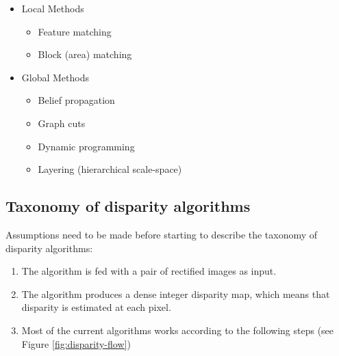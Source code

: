 \begin{itemize}
  \item Local Methods
  \begin{itemize}
    \item Feature matching
    \item Block (area) matching
  \end{itemize}
  \item Global Methods
  \begin{itemize}
    \item Belief propagation
    \item Graph cuts
    \item Dynamic programming
    \item Layering (hierarchical scale-space)
  \end{itemize}
\end{itemize}

\subsection*{Taxonomy of disparity algorithms}

\noindent Assumptions need to be made before starting to describe the taxonomy of disparity algorithms:

\begin{enumerate}
  \item The algorithm is fed with a pair of rectified images as input.
  \item The algorithm produces a dense integer disparity map, which means that disparity is estimated at each pixel.
  \item Most of the current algorithms works according to the following steps (see Figure \ref{fig:disparity-flow})
\end{enumerate}

